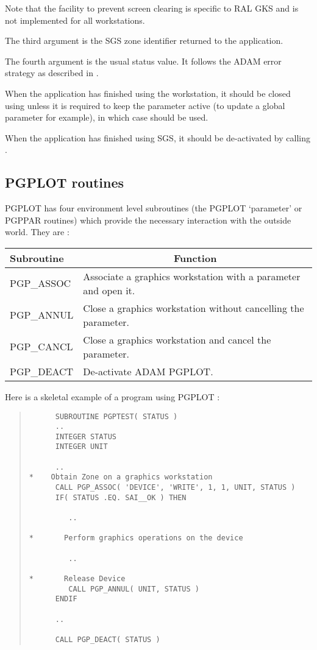 Note that the facility to prevent screen clearing is specific to RAL GKS and
is not implemented for all workstations.

The third argument is the SGS zone identifier returned to the application.

The fourth argument is the usual status value. It follows the ADAM error
strategy as described in .

When the application has finished using the workstation, it should be closed
using  unless it is 
required to keep the parameter active 
(to update a global parameter for example), in which case 
should be used.

When the application has finished using SGS, it should be de-activated by
calling .

\subsection{PGPLOT routines\label{pgplot}}

PGPLOT has four environment level subroutines (the PGPLOT `parameter' or PGPPAR 
routines) which provide the necessary interaction with the outside world.
They are :

\begin{center}
\begin{tabular}{||l|l||} \hline
Subroutine & \multicolumn{1}{c||}{Function} \\ \hline
PGP\_ASSOC  & Associate a graphics workstation with a parameter and open it.\\
PGP\_ANNUL  & Close a graphics workstation without cancelling the parameter.\\
PGP\_CANCL  & Close a graphics workstation and cancel the parameter.\\
PGP\_DEACT  & De-activate ADAM PGPLOT.\\ \hline
\end{tabular}
\end{center}

Here is a skeletal example of a program using PGPLOT :
\begin{quote}
\begin{verbatim}
      SUBROUTINE PGPTEST( STATUS )
      ..
      INTEGER STATUS
      INTEGER UNIT

      ..
*    Obtain Zone on a graphics workstation
      CALL PGP_ASSOC( 'DEVICE', 'WRITE', 1, 1, UNIT, STATUS )
      IF( STATUS .EQ. SAI__OK ) THEN

         ..

*       Perform graphics operations on the device

         ..

*       Release Device
         CALL PGP_ANNUL( UNIT, STATUS )
      ENDIF

      ..

      CALL PGP_DEACT( STATUS )

\end{verbatim}
\end{quote}

